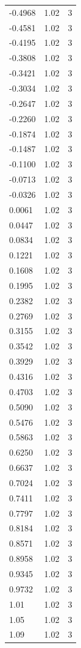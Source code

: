 \begin{longtable}{lrr}
  -0.4968 & 1.02 & 3 \\
  -0.4581 & 1.02 & 3 \\
  -0.4195 & 1.02 & 3 \\
  -0.3808 & 1.02 & 3 \\
  -0.3421 & 1.02 & 3 \\
  -0.3034 & 1.02 & 3 \\
  -0.2647 & 1.02 & 3 \\
  -0.2260 & 1.02 & 3 \\
  -0.1874 & 1.02 & 3 \\
  -0.1487 & 1.02 & 3 \\
  -0.1100 & 1.02 & 3 \\
  -0.0713 & 1.02 & 3 \\
  -0.0326 & 1.02 & 3 \\
  0.0061 & 1.02 & 3 \\
  0.0447 & 1.02 & 3 \\
  0.0834 & 1.02 & 3 \\
  0.1221 & 1.02 & 3 \\
  0.1608 & 1.02 & 3 \\
  0.1995 & 1.02 & 3 \\
  0.2382 & 1.02 & 3 \\
  0.2769 & 1.02 & 3 \\
  0.3155 & 1.02 & 3 \\
  0.3542 & 1.02 & 3 \\
  0.3929 & 1.02 & 3 \\
  0.4316 & 1.02 & 3 \\
  0.4703 & 1.02 & 3 \\
  0.5090 & 1.02 & 3 \\
  0.5476 & 1.02 & 3 \\
  0.5863 & 1.02 & 3 \\
  0.6250 & 1.02 & 3 \\
  0.6637 & 1.02 & 3 \\
  0.7024 & 1.02 & 3 \\
  0.7411 & 1.02 & 3 \\
  0.7797 & 1.02 & 3 \\
  0.8184 & 1.02 & 3 \\
  0.8571 & 1.02 & 3 \\
  0.8958 & 1.02 & 3 \\
  0.9345 & 1.02 & 3 \\
  0.9732 & 1.02 & 3 \\
  1.01 & 1.02 & 3 \\
  1.05 & 1.02 & 3 \\
  1.09 & 1.02 & 3 \\

\end{longtable}
